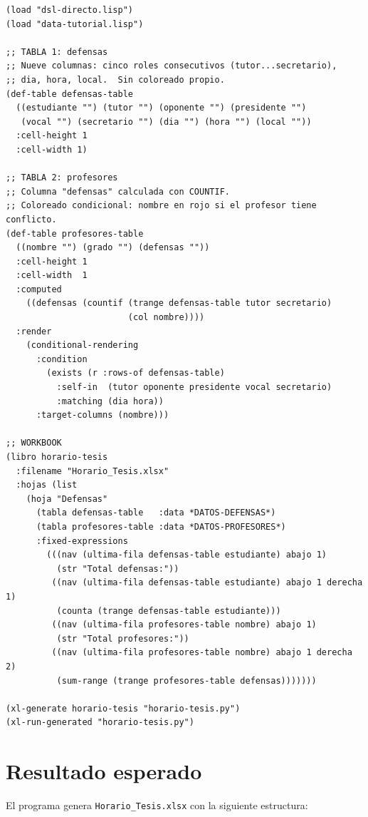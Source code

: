\documentclass[12pt,a4paper]{report}
\begin{document}
\begin{lstlisting}[caption={tutorial-horario.lisp --- programa DSL completo.}]
(load "dsl-directo.lisp")
(load "data-tutorial.lisp")

;; TABLA 1: defensas
;; Nueve columnas: cinco roles consecutivos (tutor...secretario),
;; dia, hora, local.  Sin coloreado propio.
(def-table defensas-table
  ((estudiante "") (tutor "") (oponente "") (presidente "")
   (vocal "") (secretario "") (dia "") (hora "") (local ""))
  :cell-height 1
  :cell-width 1)

;; TABLA 2: profesores
;; Columna "defensas" calculada con COUNTIF.
;; Coloreado condicional: nombre en rojo si el profesor tiene conflicto.
(def-table profesores-table
  ((nombre "") (grado "") (defensas ""))
  :cell-height 1
  :cell-width  1
  :computed
    ((defensas (countif (trange defensas-table tutor secretario)
                        (col nombre))))
  :render
    (conditional-rendering
      :condition
        (exists (r :rows-of defensas-table)
          :self-in  (tutor oponente presidente vocal secretario)
          :matching (dia hora))
      :target-columns (nombre)))

;; WORKBOOK
(libro horario-tesis
  :filename "Horario_Tesis.xlsx"
  :hojas (list
    (hoja "Defensas"
      (tabla defensas-table   :data *DATOS-DEFENSAS*)
      (tabla profesores-table :data *DATOS-PROFESORES*)
      :fixed-expressions
        (((nav (ultima-fila defensas-table estudiante) abajo 1)
          (str "Total defensas:"))
         ((nav (ultima-fila defensas-table estudiante) abajo 1 derecha 1)
          (counta (trange defensas-table estudiante)))
         ((nav (ultima-fila profesores-table nombre) abajo 1)
          (str "Total profesores:"))
         ((nav (ultima-fila profesores-table nombre) abajo 1 derecha 2)
          (sum-range (trange profesores-table defensas)))))))

(xl-generate horario-tesis "horario-tesis.py")
(xl-run-generated "horario-tesis.py")
\end{lstlisting}

\section{Resultado esperado}
\label{sec:resultado}

El programa genera \texttt{Horario\_Tesis.xlsx} con la siguiente estructura:
\end{document}
